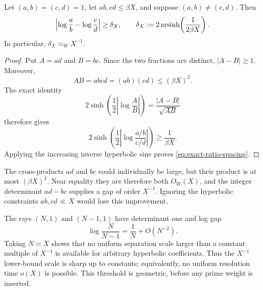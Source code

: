 \begin{lemma}
\label{lem:ratio-spacing}
Let $(a,b)=(c,d)=1$, let $ab,cd\leq\beta X$, and suppose
$(a,b)\ne(c,d)$.  Then
\begin{equation}
 \left|\log\frac{a}{b}-\log\frac{c}{d}\right|
 \geq
 \delta_X,
 \qquad
 \delta_X:=2\operatorname{arsinh}\!\left(\frac{1}{2\beta X}\right).
 \label{eq:exact-ratio-spacing}
\end{equation}
In particular, $\delta_X\asymp_W X^{-1}$.
\end{lemma}

\begin{proof}
Put $A=ad$ and $B=bc$.  Since the two fractions are distinct,
$|A-B|\geq1$.  Moreover,
\[
 AB=abcd=(ab)(cd)\leq(\beta X)^2.
\]
The exact identity
\[
 2\sinh\!\left(\frac12\left|\log\frac{A}{B}\right|\right)
 =\frac{|A-B|}{\sqrt{AB}}
\]
therefore gives
\[
 2\sinh\!\left(\frac12\left|\log\frac{a/b}{c/d}\right|\right)
 \geq\frac1{\beta X}.
\]
Applying the increasing inverse hyperbolic sine proves
\eqref{eq:exact-ratio-spacing}.
\end{proof}

\begin{remark}
The cross-products $ad$ and $bc$ could individually be large, but their
product is at most $(\beta X)^2$.  Near equality they are therefore both
$O_W(X)$, and the integer determinant $ad-bc$ supplies a gap of order
$X^{-1}$.  Ignoring the hyperbolic constraints $ab,cd\ll X$ would lose
this improvement.
\end{remark}

\begin{remark}
The rays $(N,1)$ and $(N-1,1)$ have determinant one and log gap
\[
 \log\frac{N}{N-1}=\frac1N+O(N^{-2}).
\]
Taking $N\asymp X$ shows that no uniform separation scale
larger than a constant multiple of $X^{-1}$ is available for arbitrary
hyperbolic coefficients.  Thus the $X^{-1}$ lower-bound scale is sharp up
to constants; equivalently, no uniform resolution time $o(X)$ is possible.
This threshold is geometric, before any prime weight is inserted.
\end{remark}
